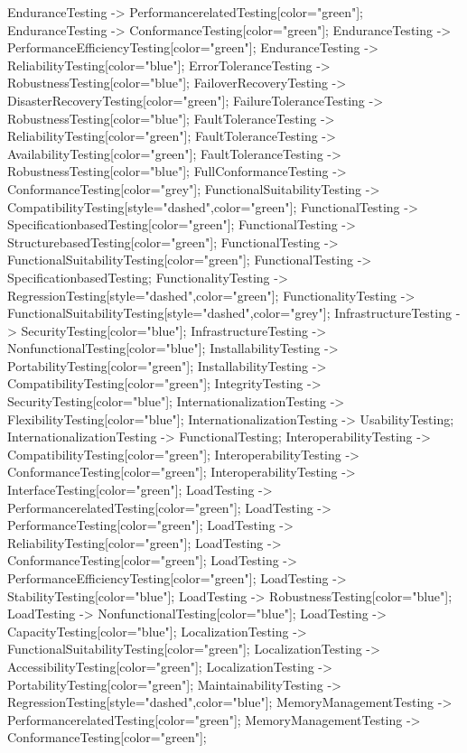 \documentclass{article}
\begin{document}
{EnduranceTesting -> PerformancerelatedTesting[color="green"];
EnduranceTesting -> ConformanceTesting[color="green"];
EnduranceTesting -> PerformanceEfficiencyTesting[color="green"];
EnduranceTesting -> ReliabilityTesting[color="blue"];
ErrorToleranceTesting -> RobustnessTesting[color="blue"];
FailoverRecoveryTesting -> DisasterRecoveryTesting[color="green"];
FailureToleranceTesting -> RobustnessTesting[color="blue"];
FaultToleranceTesting -> ReliabilityTesting[color="green"];
FaultToleranceTesting -> AvailabilityTesting[color="green"];
FaultToleranceTesting -> RobustnessTesting[color="blue"];
FullConformanceTesting -> ConformanceTesting[color="grey"];
FunctionalSuitabilityTesting -> CompatibilityTesting[style="dashed",color="green"];
FunctionalTesting -> SpecificationbasedTesting[color="green"];
FunctionalTesting -> StructurebasedTesting[color="green"];
FunctionalTesting -> FunctionalSuitabilityTesting[color="green"];
FunctionalTesting -> SpecificationbasedTesting;
FunctionalityTesting -> RegressionTesting[style="dashed",color="green"];
FunctionalityTesting -> FunctionalSuitabilityTesting[style="dashed",color="grey"];
InfrastructureTesting -> SecurityTesting[color="blue"];
InfrastructureTesting -> NonfunctionalTesting[color="blue"];
InstallabilityTesting -> PortabilityTesting[color="green"];
InstallabilityTesting -> CompatibilityTesting[color="green"];
IntegrityTesting -> SecurityTesting[color="blue"];
InternationalizationTesting -> FlexibilityTesting[color="blue"];
InternationalizationTesting -> UsabilityTesting;
InternationalizationTesting -> FunctionalTesting;
InteroperabilityTesting -> CompatibilityTesting[color="green"];
InteroperabilityTesting -> ConformanceTesting[color="green"];
InteroperabilityTesting -> InterfaceTesting[color="green"];
LoadTesting -> PerformancerelatedTesting[color="green"];
LoadTesting -> PerformanceTesting[color="green"];
LoadTesting -> ReliabilityTesting[color="green"];
LoadTesting -> ConformanceTesting[color="green"];
LoadTesting -> PerformanceEfficiencyTesting[color="green"];
LoadTesting -> StabilityTesting[color="blue"];
LoadTesting -> RobustnessTesting[color="blue"];
LoadTesting -> NonfunctionalTesting[color="blue"];
LoadTesting -> CapacityTesting[color="blue"];
LocalizationTesting -> FunctionalSuitabilityTesting[color="green"];
LocalizationTesting -> AccessibilityTesting[color="green"];
LocalizationTesting -> PortabilityTesting[color="green"];
MaintainabilityTesting -> RegressionTesting[style="dashed",color="blue"];
MemoryManagementTesting -> PerformancerelatedTesting[color="green"];
MemoryManagementTesting -> ConformanceTesting[color="green"];
}
\end{document}
